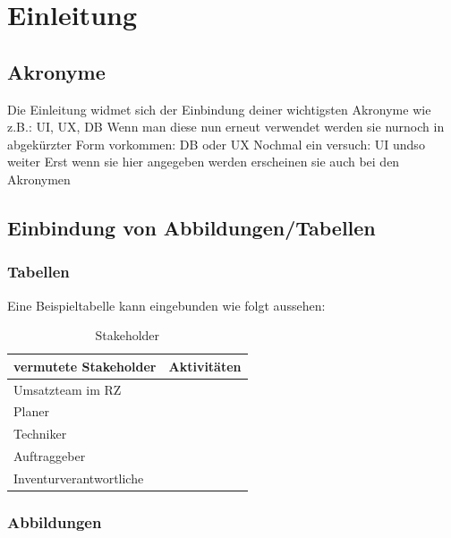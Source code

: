 \chapter{Einleitung}

\section{Akronyme}

Die Einleitung widmet sich der Einbindung deiner wichtigsten Akronyme wie z.B.: 
\gls{UI}, \gls{UX}, \gls{DB}
Wenn man diese nun erneut verwendet werden sie nurnoch in abgekürzter Form vorkommen: 
\gls{DB} oder \gls{UX}
Nochmal ein versuch: \gls{UI} undso weiter
Erst wenn sie hier angegeben werden erscheinen sie auch bei den Akronymen

\section{Einbindung von Abbildungen/Tabellen}
\subsection{Tabellen}

Eine Beispieltabelle kann eingebunden wie folgt aussehen: 
\begin{table}[h]
\centering
\begin{tabular}{|l|l|}
\hline
\textbf{vermutete Stakeholder} & \textbf{Aktivitäten}  \\ \hline
Umsatzteam im RZ        &             \\ \hline
Planer                  &             \\ \hline
Techniker               &             \\ \hline
Auftraggeber            &             \\ \hline
Inventurverantwortliche &             \\ \hline
\end{tabular}
\caption{Stakeholder}
\end{table}

\newpage
\subsection{Abbildungen}

